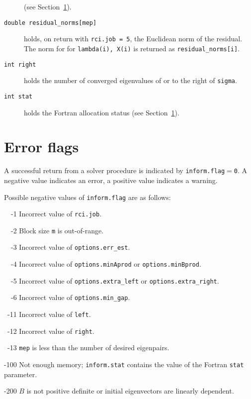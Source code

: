\begin{description}
(see Section~\ref{ssmfe_expert:errors}).
%
\item[\texttt{double residual\_norms[mep]}] holds, on return with 
{\tt rci.job = 5}, the Euclidean norm of the residual. The norm for
for {\tt lambda(i), X(i)} is returned as {\tt residual\_norms[i]}.
%
\item[\texttt{int right}]
holds the number of converged eigenvalues 
of  or 
to the right of {\tt sigma}.
%
\item[\texttt{int stat}]
holds the Fortran allocation status
(see Section~\ref{ssmfe_expert:errors}).
%
\end{description}

\section{Error flags}

\label{ssmfe_expert:errors}

A successful return from
a solver procedure
is indicated 
by {\tt inform.flag$=$0}.
A negative value indicates an error, a positive value indicates a warning.

Possible negative values of {\tt inform.flag}
are as follows:
%
\begin{description}
%
\item{~~-1}
\hskip 9pt
Incorrect value of {\tt rci.job}.
%
\item{~~-2}
\hskip 9pt
Block size {\tt m} is out-of-range.
%
\item{~~-3}
\hskip 9pt
Incorrect value of 
{\tt options.err\_est}. %
%
\item{~~-4}
\hskip 9pt
Incorrect value of 
{\tt options.minAprod} or {\tt options.minBprod}.
%
\item{~~-5}
\hskip 9pt
Incorrect value of 
{\tt options.extra\_left} or
{\tt options.extra\_right}.
%
\item{~~-6}
\hskip 9pt
Incorrect value of 
{\tt options.min\_gap}. %
%
\item{~-11}
\hskip 7pt
Incorrect value of 
{\tt left}. %
%
\item{~-12}
\hskip 7pt
Incorrect value of 
{\tt right}. %
%
\item{~-13}
\hskip 7pt
{\tt mep} is less than 
the number of desired eigenpairs.
%
\item{-100}
\hskip 4pt
Not enough memory;
{\tt inform.stat} contains the value of the Fortran {\tt stat} parameter.
%
\item{-200}
\hskip 4pt
$B$ is not positive definite or initial eigenvectors are linearly dependent.
%
\end{description}


